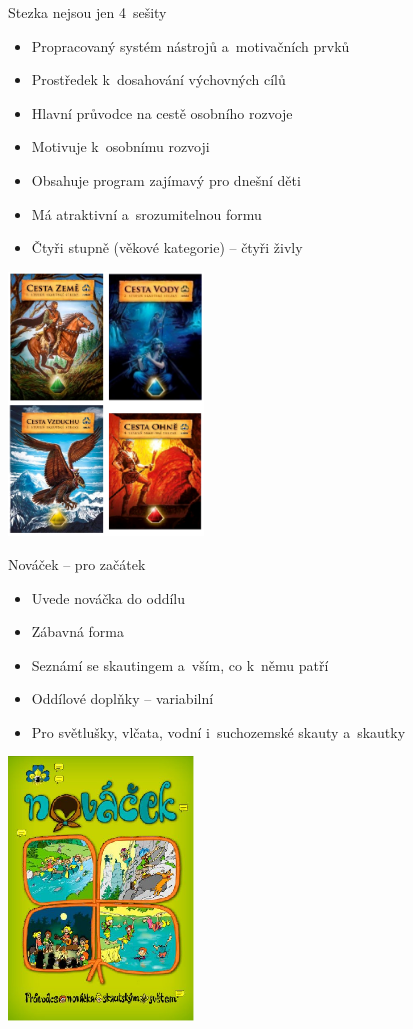 \documentclass[compress,xelatex,xcolor=dvipsnames,print]{beamer}
\begin{document}
\begin{frame}{Stezka nejsou jen 4~sešity}
\begin{multicols}{2}
\begin{itemize}
\item Propracovaný systém nástrojů a~motivačních prvků
\item Prostředek k~dosahování výchovných cílů
\item Hlavní průvodce na cestě osobního rozvoje
\item Motivuje k~osobnímu rozvoji
\item Obsahuje program zajímavý pro dnešní děti
\item Má atraktivní a~srozumitelnou formu
\item Čtyři stupně (věkové kategorie) -- čtyři živly
\end{itemize}
\columnbreak
\includegraphics[height=7cm]{stezky.png}
\end{multicols}
\end{frame}

\begin{frame}{Nováček -- pro začátek}
\begin{multicols}{2}
\begin{itemize}
\item Uvede nováčka do oddílu
\item Zábavná forma
\item Seznámí se skautingem a~vším, co k~němu patří
\item Oddílové doplňky -- variabilní
\item Pro světlušky, vlčata, vodní i~suchozemské skauty a~skautky
\end{itemize}
\columnbreak
\includegraphics[height=7cm]{novacek.png}
\end{multicols}
\end{frame}
\end{document}
